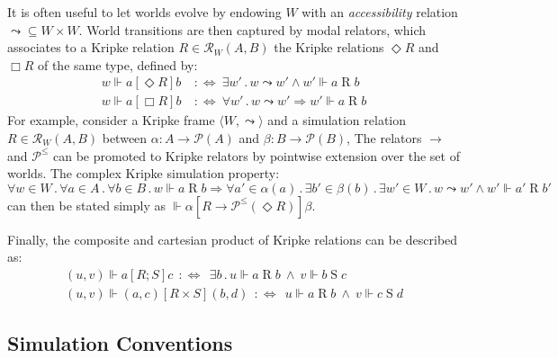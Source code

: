 \documentclass[acmsmall,screen,review,anonymous]{acmart}
\newcommand{\ifr}[1]{\mathrel{[{#1}]}}
\newcommand{\vcomp}{\fatsemi}
\begin{document}
It is often useful to let worlds evolve
by endowing $W$ with an \emph{accessibility} relation
${\leadsto} \subseteq W \times W$.
World transitions are then captured by modal relators,
which associates to a Kripke relation $R \in \mathcal{R}_W(A, B)$
the Kripke relations $\Diamond R$ and $\Box R$ of the same type, defined by:
\begin{align*}
  w \Vdash a \ifr{\Diamond R} b
  \:&:\Leftrightarrow\:
  \exists w' \mathbin. w \leadsto w' \wedge w' \Vdash a \mathrel{R} b
\\
  w \Vdash a \ifr{\Box R} b
  \:&:\Leftrightarrow\:
  \forall w' \mathbin. w \leadsto w' \Rightarrow w' \Vdash a \mathrel{R} b
\end{align*}
For example,
consider a Kripke frame $\langle W, {\leadsto} \rangle$ and
a simulation relation $R \in \mathcal{R}_W(A, B)$
between $\alpha : A \rightarrow \mathcal{P}(A)$
and $\beta : B \rightarrow \mathcal{P}(B)$,
The relators $\rightarrow$ and $\mathcal{P}^\le$
can be promoted to Kripke relators
by pointwise extension over the set of worlds.
The complex Kripke simulation property:
{\small
\[
  \forall w \in W \mathbin.
  \forall a \in A \mathbin.
  \forall b \in B \mathbin.
  w \Vdash a \mathrel{R} b \Rightarrow
  \forall a' \in \alpha(a) \mathbin.
  \exists b' \in \beta(b) \mathbin.
  \exists w' \in W \mathbin.
  w \leadsto w' \wedge w' \Vdash a' \mathrel{R} b'
\]
}
can then be stated simply as
$
  \Vdash \alpha \ifr{R \rightarrow \mathcal{P}^\le(\Diamond R)} \beta
$.

Finally,
the composite and cartesian product
of Kripke relations can be described as:
\[
  \begin{array}{c}
    (u, v) \Vdash a \mathrel{[R \mathbin; S]} c \:\::\Leftrightarrow\:\:
      \exists b \mathbin.
        u \Vdash a \mathrel{R} b \:\wedge\: v \Vdash b \mathrel{S} c
  \\
    (u, v) \Vdash (a, c) \mathrel{[R \times S]} (b, d) \:\::\Leftrightarrow\:\:
      u \Vdash a \mathrel{R} b \:\wedge\: v \Vdash c \mathrel{S} d
  \end{array}
\]

\subsection{Simulation Conventions} %
\end{document}
